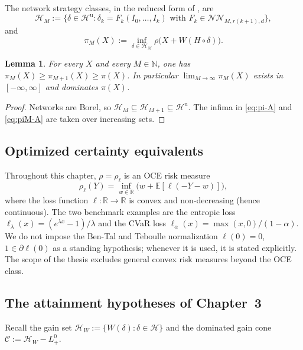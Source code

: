 \documentclass[11pt,a4paper]{report}
\numberwithin{equation}{chapter}
\theoremstyle{plain}
\newtheorem{lemma}[proposition]{Lemma}
\theoremstyle{definition}
\newcommand{\E}{\mathbb{E}}
\newcommand{\R}{\mathbb{R}}
\newcommand{\N}{\mathbb{N}}
\newcommand{\HH}{\mathcal{H}}
\newcommand{\Hu}{\mathcal{H}^{\mathrm{u}}}
\newcommand{\CC}{\mathcal{C}}
\newcommand{\NNet}{\mathcal{N\!N}}
\begin{document}
The network strategy classes, in the reduced form of \cite[proof of Proposition~4.3]{buehler}, are
\[
    \HH_M:=\bigl\{\delta\in\Hu:\delta_k=F_k(I_0,\dots,I_k)\text{ with }F_k\in\NNet_{M,r(k+1),d}\bigr\},
\]
and
\begin{equation}\label{eq:piM-A}
    \pi_M(X):=\inf_{\delta\in\HH_M}\rho\bigl(X+W(H\circ\delta)\bigr).
\end{equation}

\begin{lemma}\label{lem:monotone-A}
    For every $X$ and every $M\in\N$, one has $\pi_M(X)\ge\pi_{M+1}(X)\ge\pi(X)$. In particular $\lim_{M\to\infty}\pi_M(X)$ exists in $[-\infty,\infty]$ and dominates $\pi(X)$.
\end{lemma}

\begin{proof}
    Networks are Borel, so $\HH_M\subseteq\HH_{M+1}\subseteq\Hu$. The infima in \eqref{eq:pi-A} and \eqref{eq:piM-A} are taken over increasing sets.
\end{proof}

\subsection*{Optimized certainty equivalents}

Throughout this chapter, $\rho=\rho_\ell$ is an OCE risk measure
\[
    \rho_\ell(Y)=\inf_{w\in\R}\bigl(w+\E[\ell(-Y-w)]\bigr),
\]
where the loss function $\ell\colon\R\to\R$ is convex and non-decreasing (hence continuous). The two benchmark examples are the entropic loss $\ell_\lambda(x)=(e^{\lambda x}-1)/\lambda$ and the CVaR loss $\ell_\alpha(x)=\max(x,0)/(1-\alpha)$. We do not impose the Ben-Tal and Teboulle normalization $\ell(0)=0$, $1\in\partial\ell(0)$ as a standing hypothesis; whenever it is used, it is stated explicitly. The scope of the thesis excludes general convex risk measures beyond the OCE class.

\subsection*{The attainment hypotheses of Chapter~3}

Recall the gain set $\HH_W:=\{W(\delta):\delta\in\HH\}$ and the dominated gain cone $\CC:=\HH_W-L^0_+$.
\end{document}
